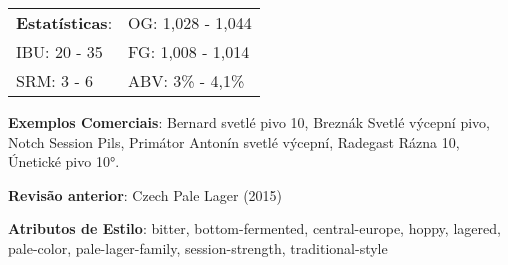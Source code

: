 \begin{tabular}{@{}p{35mm}p{35mm}@{}}
  \textbf{Estatísticas}: & OG: 1,028 - 1,044 \\
  IBU: 20 - 35  & FG: 1,008 - 1,014  \\
  SRM: 3 - 6   & ABV: 3\% - 4,1\%
\end{tabular}

\textbf{Exemplos Comerciais}: Bernard svetlé pivo 10, Breznák Svetlé výcepní pivo, Notch Session Pils, Primátor Antonín svetlé výcepní, Radegast Rázna 10, Únetické pivo 10°.

\textbf{Revisão anterior}: Czech Pale Lager (2015)

\textbf{Atributos de Estilo}: bitter, bottom-fermented, central-europe, hoppy, lagered, pale-color, pale-lager-family, session-strength, traditional-style